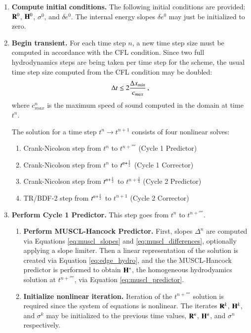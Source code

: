 \begin{enumerate}

\item \textbf{Compute initial conditions.} The following initial conditions
are provided: $\mathbf{R}^0$, $\mathbf{H}^0$, $\sigma^0$, and $\delta e^0$. The internal
energy slopes $\delta e^0$ may just be initialized to zero.

\item \textbf{Begin transient.} For each time step $n$, a new time step
size must be computed in accordance with the CFL condition. Since two
full hydrodynamics steps are being taken per time step for the scheme,
the usual time step size computed from the CFL condition may be doubled:
\begin{equation}
   \Delta t \leq 2\frac{\Delta x_{min}}{c_{max}} \, ,
\end{equation}
where $c_{max}^n$ is the maximum speed of sound computed in the domain
at time $t^n$.

The solution for a time step $t^n\rightarrow t^{n+1}$ consists of four
nonlinear solves:

\begin{enumerate}
  \item Crank-Nicolson step from $t^n$ to $t^{n+\fourth}$
    (Cycle 1 Predictor)
  \item Crank-Nicolson step from $t^n$ to $t^{n+\frac{1}{2}}$
    (Cycle 1 Corrector)
  \item Crank-Nicolson step from $t^{n+\frac{1}{2}}$ to $t^{n+\frac{3}{4}}$
    (Cycle 2 Predictor)
  \item TR/BDF-2 step from $t^{n+\frac{1}{2}}$ to $t^{n+1}$
    (Cycle 2 Corrector)
\end{enumerate}


\item \textbf{Perform Cycle 1 Predictor.} This step goes from
$t^n$ to $t^{n+\fourth}$.

\begin{enumerate}
\item \textbf{Perform MUSCL-Hancock Predictor.} First, slopes $\Delta^n$ are
computed via Equations \eqref{eq:muscl_slopes} and \eqref{eq:muscl_differences},
optionally applying a slope limiter.
Then a linear representation of the solution is created via
Equation \eqref{eq:edge_hydro}, and the
the MUSCL-Hancock predictor is performed to obtain $\mathbf{H}^*$, the
homogeneous hydrodyamics solution at $t^{n+\fourth}$,
via Equation \eqref{eq:muscl_predictor}.

\item \textbf{Initialize nonlinear iteration.} Iteration of the
$t^{n+\fourth}$ solution is required since the system of equations
is nonlinear. The iterates $\mathbf{R}^k$, $\mathbf{H}^k$, and $\sigma^k$ may be initialized
to the previous time
values, $\mathbf{R}^n$, $\mathbf{H}^n$, and $\sigma^n$ respectively.


\end{enumerate}
\end{enumerate}
